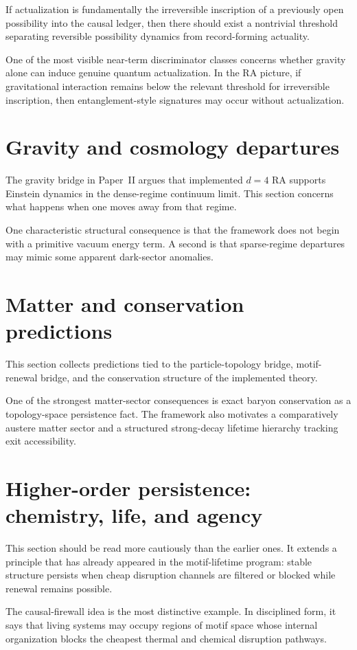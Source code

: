 \documentclass[11pt]{article}
\begin{document}
If actualization is fundamentally the irreversible inscription of a previously open possibility into the causal ledger, then there should exist a nontrivial threshold separating reversible possibility dynamics from record-forming actuality.

One of the most visible near-term discriminator classes concerns whether gravity alone can induce genuine quantum actualization. In the RA picture, if gravitational interaction remains below the relevant threshold for irreversible inscription, then entanglement-style signatures may occur without actualization.

\section{Gravity and cosmology departures}
The gravity bridge in Paper~II argues that implemented $d=4$ RA supports Einstein dynamics in the dense-regime continuum limit. This section concerns what happens when one moves away from that regime.

One characteristic structural consequence is that the framework does not begin with a primitive vacuum energy term. A second is that sparse-regime departures may mimic some apparent dark-sector anomalies.

\section{Matter and conservation predictions}
This section collects predictions tied to the particle-topology bridge, motif-renewal bridge, and the conservation structure of the implemented theory.

One of the strongest matter-sector consequences is exact baryon conservation as a topology-space persistence fact. The framework also motivates a comparatively austere matter sector and a structured strong-decay lifetime hierarchy tracking exit accessibility.

\section{Higher-order persistence: chemistry, life, and agency}
This section should be read more cautiously than the earlier ones. It extends a principle that has already appeared in the motif-lifetime program: stable structure persists when cheap disruption channels are filtered or blocked while renewal remains possible.

The causal-firewall idea is the most distinctive example. In disciplined form, it says that living systems may occupy regions of motif space whose internal organization blocks the cheapest thermal and chemical disruption pathways.
\end{document}
